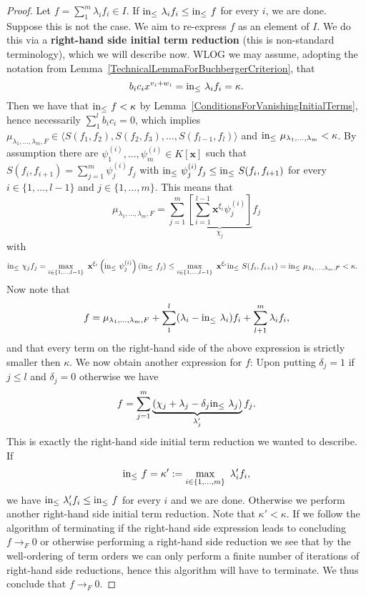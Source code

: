 \begin{proof}
    Let $f = \sum_1^m \lambda_if_i\in I$. If $\mathrm{in}_\leq\ \lambda_if_i\leq \mathrm{in}_\leq\ f$ for every $i$, we are done.\\
    Suppose this is not the case. We aim to re-express $f$ as an element of $I$. We do this via a \textbf{right-hand side initial term reduction} (this is non-standard terminology), which we will describe now. WLOG we may assume, adopting the notation from Lemma~\ref{TechnicalLemmaForBuchbergerCriterion}, that 
    $$b_ic_ix^{v_i+w_i}=\mathrm{in}_\leq \ \lambda_if_i =\kappa.$$
    Then we have that $\mathrm{in}_\leq\ f < \kappa$ by Lemma~\ref{ConditionsForVanishingInitialTerms}, hence necessarily $\sum_1^l b_ic_i =0$, which implies $\mu_{\lambda_1,\dots,\lambda_m,F} \in \langle S(f_1,f_2),S(f_2,f_3),\dots,S(f_{l-1},f_l)\rangle$ and $\mathrm{in}_\leq\ \mu_{\lambda_1,\dots,\lambda_m}< \kappa$. By assumption there are $\psi_1^{(i)},\dots,\psi_m^{(i)}\in K[\mathbf{x}]$ such that $S(f_i,f_{i+1})=\sum_{j=1}^m \psi_j^{(i)}f_j$ with $\inn\ \psi^{(i)}_jf_j \leq \inn\ S(f_i,f_{i+1})$ for every $i\in \{1,\dots,l-1\}$ and $j\in\{1,\dots,m\}$. This means that 
    $$\mu_{\lambda_1,\dots,\lambda_m,F} = \sum_{j=1}^m\underbrace{\left[\sum_{i=1}^{l-1} \mathbf{x}^{\xi_i}\psi_j^{(i)}\right]}_{\chi_j}f_j$$
    with 
    \begin{align*} 
        \inn\ \chi_jf_j &= \max_{i\in\{1,\dots,l-1\}}\ \mathbf{x}^{\xi_i}\left(\inn\ \psi_j^{(i)}\right)\left(\inn\ f_j\right)\leq \max_{i\in\{1,\dots,l-1\}}\ \mathbf{x}^{\xi_i}\inn\ S(f_i,f_{i+1}) = \inn\ \mu_{\lambda_1,\dots,\lambda_m,F} < \kappa.
    \end{align*}
    Now note that 
    \begin{align*}
        f = \mu_{\lambda_1,\dots,\lambda_m,F} + \sum_1^l (\lambda_i-\mathrm{in}_\leq\ \lambda_i)f_i+\sum_{l+1}^{m} \lambda_if_i,
    \end{align*}
    and that every term on the right-hand side of the above expression is strictly smaller then $\kappa$. We now obtain another expression for $f$: Upon putting $\delta_j = 1$ if $j\leq l$ and $\delta_j = 0$ otherwise we have
    $$f = \sum_{j=1}^m\underbrace{\left(\chi_j+\lambda_j-\delta_j\inn\ \lambda_j\right)}_{\lambda_j'}f_j.$$
    This is exactly the right-hand side initial term reduction we wanted to describe.
    If 
    $$\inn \ f = \kappa' := \max_{i\in\{1,\dots,m\}} \ \lambda_i'f_i,$$
    we have $\inn\ \lambda_i'f_i\leq \inn\ f $ for every $i$ and we are done. Otherwise we perform another right-hand side initial term reduction. Note that $\kappa'< \kappa$. If we follow the algorithm of terminating if the right-hand side expression leads to concluding $f\to_F 0$ or otherwise performing a right-hand side reduction we see that by the well-ordering of term orders we can only perform a finite number of iterations of right-hand side reductions, hence this algorithm will have to terminate. We thus conclude that $f\to_F 0$.   
\end{proof}
